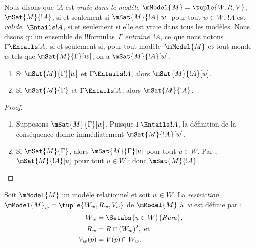 \documentclass[../../../include/open-logic-section]{subfiles}
\begin{document}


\begin{defn}
  Nous disons que $!A$ est \emph{vraie dans le modèle
  $\mModel{M} = \tuple{W,R,V}$}, $\mSat{M}{!A}$, si et seulement si
  $\mSat{M}{!A}[w]$ pour tout $w \in W$.
  $!A$ est \emph{valide}, $\Entails !A$, si et seulement si elle est
  vraie dans tous les modèles. Nous disons qu'un ensemble de
  !!{formula}s~$\Gamma$ \emph{entraîne}~$!A$, ce que nous notons
  $\Gamma \Entails !A$, si et seulement si, pour tout
  modèle~$\mModel{M}$ et tout monde~$w$ tels que
  $\mSat{M}{\Gamma}[w]$, on a $\mSat{M}{!A}[w]$.
\end{defn}

\begin{prop}
  \begin{enumerate}
  \item{} Si $\mSat{M}{\Gamma}[w]$ et
    $\Gamma \Entails !A$, alors $\mSat{M}{!A}[w]$.
  \item{} Si $\mSat{M}{\Gamma}$ et $\Gamma
    \Entails !A$, alors $\mSat{M}{!A}$.
  \end{enumerate}
\end{prop}

\begin{proof}
  \begin{enumerate}
  \item Supposons $\mSat{M}{\Gamma}[w]$. Puisque
    $\Gamma \Entails !A$, la définition de la conséquence donne
    immédiatement $\mSat{M}{!A}[w]$.
  \item Si $\mSat{M}{\Gamma}$, alors $\mSat{M}{\Gamma}[u]$ pour tout
    $u \in W$. Par , $\mSat{M}{!A}[u]$ pour tout
    $u \in W$ ; donc $\mSat{M}{!A}$.
  \end{enumerate}
\end{proof}

\begin{defn}
  Soit $\mModel{M}$ un modèle relationnel et soit $w \in W$. La
  \emph{restriction} $\mModel{M}_w=\tuple{W_w, R_w, V_w}$ de
  $\mModel{M}$ à~$w$ est définie par :
  \begin{align*}
    W_w & = \Setabs{u \in W}{Rwu},\\
    R_w  & = R \cap (W_w)^2, \text{ et}\\
    V_w(p) & = V(p) \cap W_w.
  \end{align*}
\end{defn}
\end{document}
